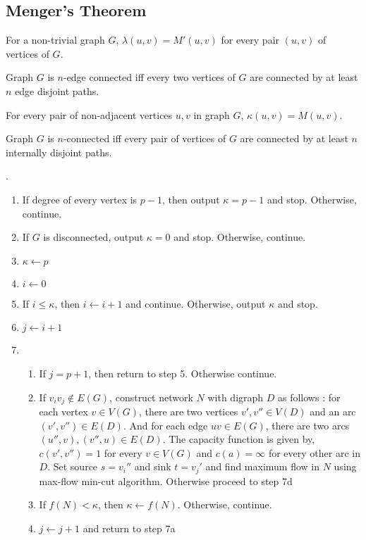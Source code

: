 \subsection{Menger's Theorem}
\begin{theorem}
	For a non-trivial graph $G$, $\lambda(u,v) = M'(u,v)$ for every pair $(u,v)$ of vertices of $G$.
\end{theorem}
\begin{corollary}
	Graph $G$ is $n$-edge connected iff every two vertices of $G$ are connected by at least $n$ edge disjoint paths.
\end{corollary}

\begin{theorem}
	For every pair of non-adjacent vertices $u,v$ in graph $G$, $\kappa(u,v) = M(u,v)$.
\end{theorem}
\begin{corollary}
	Graph $G$ is $n$-connected iff every pair of vertices of $G$ are connected by at least $n$ internally disjoint paths.
\end{corollary}

\begin{algorithm}.
	\begin{enumerate}
		\item If degree of every vertex is $p-1$, then output $\kappa = p-1$ and stop.
			Otherwise, continue.
		\item If $G$ is disconnected, output $\kappa = 0$ and stop.
			Otherwise, continue.
		\item $\kappa \leftarrow p$
		\item $i \leftarrow 0$
		\item If $i \le \kappa$, then $i \leftarrow i+1$ and continue.
			Otherwise, output $\kappa$ and stop.
		\item $j \leftarrow i+1$
		\item 
			\begin{enumerate}[label=(\arabic*)]
				\item If $j = p+1$, then return to step 5.
					Otherwise continue.
				\item If $v_iv_j \notin E(G)$, construct network $N$ with digraph $D$ as follows : for each vertex $ v \in V(G)$, there are two vertices $v',v'' \in V(D)$ and an arc $(v',v'') \in E(D)$.
					And for each edge $uv \in E(G)$, there are two arcs $(u'',v),(v'',u) \in E(D)$.
					The capacity function is given by, $c(v',v'') = 1$ for every $v \in V(G)$ and $c(a) = \infty$ for every other arc in $D$.
					Set source $s = v_i''$ and sink $t = v_j'$ and find maximum flow in $N$ using max-flow min-cut algorithm.
					Otherwise proceed to step 7d
				\item If $f(N) < \kappa$, then $\kappa \leftarrow f(N)$.
					Otherwise, continue.
				\item $j \leftarrow j+1$ and return to step 7a
			\end{enumerate}
	\end{enumerate}
\end{algorithm}

